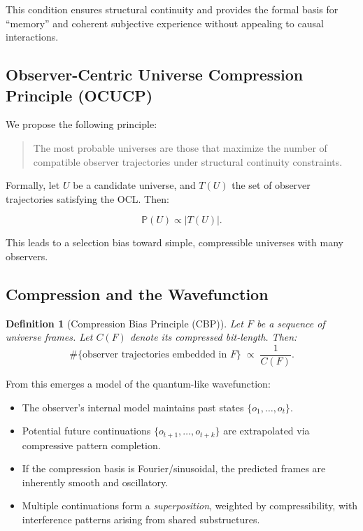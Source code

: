 \documentclass[11pt]{article}
\newtheorem{definition}{Definition}
\begin{document}
This condition ensures structural continuity and provides the formal basis for “memory” and coherent subjective experience without appealing to causal interactions.

\subsection{Observer-Centric Universe Compression Principle (OCUCP)}

We propose the following principle:

\begin{quote}
    The most probable universes are those that maximize the number of compatible observer trajectories under structural continuity constraints.
\end{quote}

Formally, let $U$ be a candidate universe, and $T(U)$ the set of observer trajectories satisfying the OCL. Then:

\[
    \mathbb{P}(U) \propto |T(U)|.
\]

This leads to a selection bias toward simple, compressible universes with many observers.

\subsection{Compression and the Wavefunction}

\begin{definition}[Compression Bias Principle (CBP)]
    Let \(F\) be a sequence of universe frames. Let \(C(F)\) denote its compressed bit-length. Then:
    \[
        \#\{\text{observer trajectories embedded in }F\}\;\propto\; \frac{1}{C(F)}.
    \]
\end{definition}

From this emerges a model of the quantum-like wavefunction:

\begin{itemize}
    \item The observer’s internal model maintains past states \(\{o_1,\dots,o_t\}\).
    \item Potential future continuations \(\{o_{t+1},\dots,o_{t+k}\}\) are extrapolated via compressive pattern completion.
    \item If the compression basis is Fourier/sinusoidal, the predicted frames are inherently smooth and oscillatory.
    \item Multiple continuations form a \emph{superposition}, weighted by compressibility, with interference patterns arising from shared substructures.
\end{itemize}
\end{document}
